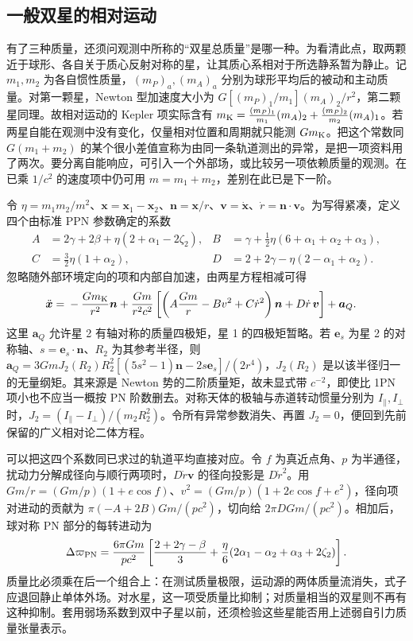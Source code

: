 \subsection{一般双星的相对运动}

有了三种质量，还须问观测中所称的“双星总质量”是哪一种。为看清此点，取两颗近于球形、各自关于质心反射对称的星，让其质心系相对于所选静系暂为静止。记 $m_1,m_2$ 为各自惯性质量，$(m_P)_a,(m_A)_a$ 分别为球形平均后的被动和主动质量。对第一颗星，Newton 型加速度大小为 $G[(m_P)_1/m_1](m_A)_2/r^2$，第二颗星同理。故相对运动的 Kepler 项实际含有 $m_{\rm K}=\frac{(m_P)_1}{m_1}(m_A)_2+ \frac{(m_P)_2}{m_2}(m_A)_1$。若两星自能在观测中没有变化，仅量相对位置和周期就只能测 $Gm_{\rm K}$。把这个常数同 $G(m_1+m_2)$ 的某个很小差值宣称为由同一条轨道测出的异常，是把一项资料用了两次。要分离自能响应，可引入一个外部场，或比较另一项依赖质量的观测。在已乘 $1/c^2$ 的速度项中仍可用 $m=m_1+m_2$，差别在此已是下一阶。

令 $\eta=m_1m_2/m^2$、$\bm x=\bm x_1-\bm x_2$、$\bm n=\bm x/r$、$\bm v=\dot{\bm x}$、$\dot r=\bm n\cdot\bm v$。为写得紧凑，定义四个由标准 PPN 参数确定的系数
\begin{align*}
 A&=2\gamma+2\beta+\eta(2+\alpha_1-2\zeta_2),&
 B&=\gamma+\tfrac12\eta(6+\alpha_1+\alpha_2+\alpha_3),\\
 C&=\tfrac32\eta(1+\alpha_2),&
 D&=2+2\gamma-\eta(2-\alpha_1+\alpha_2).
\end{align*}
忽略随外部环境定向的项和内部自加速，由两星方程相减可得
\begin{align}
 \ddot{\bm x}={}&-\frac{Gm_{\rm K}}{r^2}\bm n
   +\frac{Gm}{r^2c^2}\left[
       \left(A\frac{Gm}{r}-Bv^2+C\dot r^2\right)\bm n+D\dot r\,\bm v\right]
   +\bm a_Q .\label{eq:g3-relative-ppn}
\end{align}
这里 $\bm a_Q$ 允许星 2 有轴对称的质量四极矩，星 1 的四极矩暂略。若 $\bm e_s$ 为星 2 的对称轴、$s=\bm e_s\cdot\bm n$、$R_2$ 为其参考半径，则 $\bm a_Q=3GmJ_{2}(R_2)R_2^2[(5s^2-1)\bm n-2s\bm e_s]/(2r^4)$，$J_2(R_2)$ 是以该半径归一的无量纲矩。其来源是 Newton 势的二阶质量矩，故未显式带 $c^{-2}$，即使比 1PN 项小也不应当一概按 PN 阶数删去。对称天体的极轴与赤道转动惯量分别为 $I_\parallel,I_\perp$ 时，$J_2=(I_\parallel-I_\perp)/(m_2R_2^2)$。令所有异常参数消失、再置 $J_2=0$，便回到先前保留的广义相对论二体方程。

可以把这四个系数同已求过的轨道平均直接对应。令 $f$ 为真近点角、$p$ 为半通径，扰动力分解成径向与顺行两项时，$D\dot r\bm v$ 的径向投影是 $D\dot r^2$。用 $Gm/r=(Gm/p)(1+e\cos f)$、$v^2=(Gm/p)(1+2e\cos f+e^2)$，径向项对进动的贡献为 $\pi(-A+2B)Gm/(pc^2)$，切向给 $2\pi D Gm/(pc^2)$。相加后，球对称 PN 部分的每转进动为
\[
 \Delta\varpi_{\rm PN}=
 \frac{6\pi Gm}{pc^2}\left[
 \frac{2+2\gamma-\beta}{3}
   +\frac{\eta}{6}(2\alpha_1-\alpha_2+\alpha_3+2\zeta_2)\right].
\]
质量比必须乘在后一个组合上：在测试质量极限，运动源的两体质量流消失，式子应退回静止单体外场。对水星，这一项受质量比抑制；对质量相当的双星则不再有这种抑制。套用弱场系数到双中子星以前，还须检验这些星能否用上述弱自引力质量张量表示。

